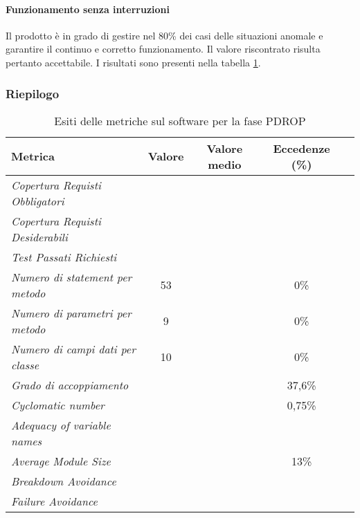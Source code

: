 \documentclass[../PianoDiQualifica.tex]{subfiles}
\begin{document}
\begin{appendices}
			\paragraph{Funzionamento senza interruzioni}	
			Il prodotto è in grado di gestire nel 80\% dei casi delle situazioni anomale e garantire il continuo e corretto funzionamento. Il valore riscontrato risulta pertanto accettabile.
			I risultati sono presenti nella tabella \ref{tab:esiti_metriche_sul_software}.
			
			\subsubsection{Riepilogo}
			\begin{table}[H]
				\centering
				\begin{tabular}{l * {4}{c}}
					\toprule
					\textbf{Metrica} & \textbf{Valore} & \textbf{Valore medio} & \textbf{Eccedenze (\%) }\\
					\midrule
					\textit{Copertura Requisti Obbligatori}  & \color{red}{77,67\%} & & \\
					\textit{Copertura Requisti Desiderabili}  & \color{red}{76,92\%} & & \\
					\textit{Test Passati Richiesti}  & & & \\
					\textit{Numero di statement per metodo} & 53 & \color{dkgreen}{4,25} & 0\% \\
					\textit{Numero di parametri per metodo} & 9 & \color{dkgreen}{0,80} & 0\% \\
					\textit{Numero di campi dati per classe} & 10 & \color{dkgreen}{2,65} & 0\% \\
					\textit{Grado di accoppiamento}  & & \color{red}{10,11} & 37,6\% \\
					\textit{Cyclomatic number} & & \color{dkgreen}{1,69} & 0,75\% \\
					\textit{Adequacy of variable names}  & \color{dkgreen}{100\%} & & \\
					\textit{Average Module Size} & & \color{dkgreen}{19,84} & 13\% \\
					\textit{Breakdown Avoidance}  & & & \\
					\textit{Failure Avoidance}  & & & \\
					\bottomrule
				\end{tabular}
				\caption{Esiti delle metriche sul software per la fase PDROP}
				\label{tab:esiti_metriche_sul_software}
			\end{table}	
\end{appendices}
\end{document}
